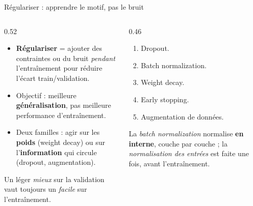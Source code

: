 
\begin{frame}{Régulariser : apprendre le motif, pas le bruit}
\begin{columns}[t]
\begin{column}{0.52\textwidth}
\begin{itemize}
  \item \textbf{Régulariser} = ajouter des contraintes ou du bruit \emph{pendant}
  l'entraînement pour réduire l'écart train/validation.
  \item Objectif : meilleure \textbf{généralisation}, pas meilleure performance
  d'entraînement.
  \item Deux familles : agir sur les \textbf{poids} (weight decay) ou sur
  l'\textbf{information} qui circule (dropout, augmentation).
\end{itemize}
\begin{kbox}[La règle d'or]
Un léger \emph{mieux} sur la validation vaut toujours un \emph{facile} sur
l'entraînement.
\end{kbox}
\end{column}
\begin{column}{0.46\textwidth}
\begin{ebox}
\begin{enumerate}
  \item Dropout.
  \item Batch normalization.
  \item Weight decay.
  \item Early stopping.
  \item Augmentation de données.
\end{enumerate}
\end{ebox}
\begin{wbox}
La \emph{batch normalization} normalise \textbf{en interne}, couche par couche ;
la \emph{normalisation des entrées} est faite une fois, avant l'entraînement.
\end{wbox}
\end{column}
\end{columns}
\end{frame}

